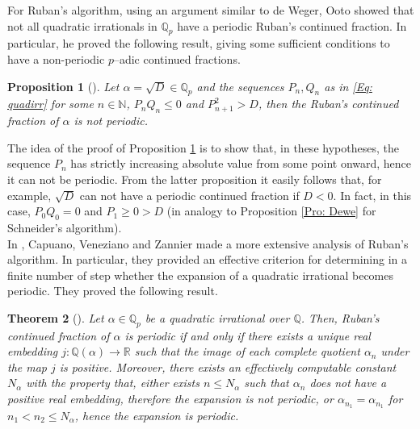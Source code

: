 \documentclass[12pt, reqno]{amsart}
\theoremstyle{plain}
\newtheorem{Theorem}{Theorem}
\newtheorem{Proposition}[Theorem]{Proposition}
\theoremstyle{definition}
\begin{document}
For Ruban's algorithm, using an argument similar to de Weger, Ooto \cite{OO} showed that not all quadratic irrationals in $\mathbb{Q}_p$ have a periodic Ruban's continued fraction. In particular, he proved the following result, giving some sufficient conditions to have a non-periodic $p$--adic continued fractions.

\begin{Proposition}[\cite{OO}]\label{Prop: Ooto}
Let $\alpha=\sqrt{D}\in\mathbb{Q}_p$ and the sequences $P_n,Q_n$ as in \eqref{Eq: quadirr} for some $n\in\mathbb{N}$, $P_nQ_n\leq 0$ and $P^2_{n+1}>D$, then the Ruban's continued fraction of $\alpha$ is not periodic.
\end{Proposition}

The idea of the proof of Proposition \ref{Prop: Ooto} is to show that, in these hypotheses, the sequence $P_n$ has strictly increasing absolute value from some point onward, hence it can not be periodic. From the latter proposition it easily follows that, for example, $\sqrt{D}$ can not have a periodic continued fraction if $D<0$. In fact, in this case, $P_0Q_0=0$ and $P_1\geq 0>D$ (in analogy to Proposition \ref{Pro: Dewe} for Schneider's algorithm).\\
In \cite{CVZ}, Capuano, Veneziano and Zannier made a more extensive analysis of  Ruban's algorithm. In particular, they provided an effective criterion for determining in a finite number of step whether the expansion of a quadratic irrational becomes periodic. They proved the following result.

\begin{Theorem}[\cite{CVZ}]\label{Thm: CVZ}
Let $\alpha\in\mathbb{Q}_p$ be a quadratic irrational over $\mathbb{Q}$. Then, Ruban's continued fraction of $\alpha$ is periodic if and only if there exists a unique real embedding $j:\mathbb{Q}(\alpha)\rightarrow \mathbb{R}$ such that the image of each complete quotient $\alpha_n$ under the map $j$ is positive. Moreover, there exists an effectively computable constant $N_{\alpha}$ with the property that, either exists $n\leq N_{\alpha}$ such that $\alpha_n$ does not have a positive real embedding, therefore the expansion is not periodic, or $\alpha_{n_1}=\alpha_{n_1}$ for $n_1<n_2\leq N_{\alpha}$, hence the expansion is periodic.
\end{Theorem}
\end{document}
